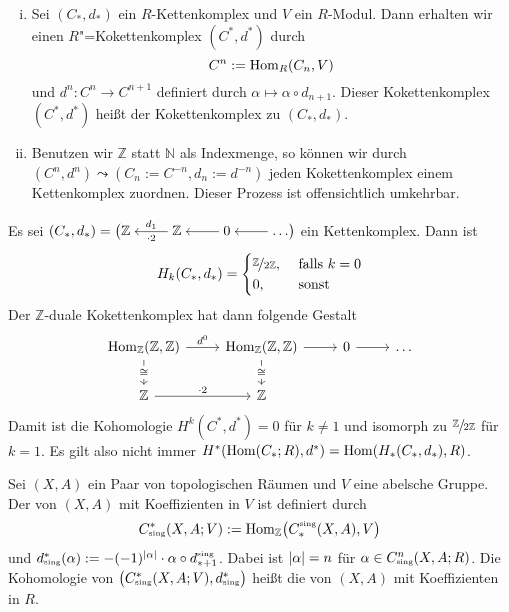 \begin{bemerkung} \leavevmode
	\begin{enumerate}[i)]
		\item Sei $(C_*,d_*)$ ein $R$-Kettenkomplex und $V$ ein $R$-Modul. Dann erhalten wir einen $R$"=Kokettenkomplex $(C^*,d^*)$ durch 
		\[
			C^n := \operatorname{Hom}_R(C_n,V) 
		\]
		und $d^n \colon C^n \to C^{n+1}$ definiert durch $\alpha \mapsto \alpha \circ d_{n+1}$. Dieser Kokettenkomplex $(C^*,d^*)$ heißt der 
		 Kokettenkomplex zu $(C_*,d_*)$. 
		\item Benutzen wir $\mathbb{Z}$ statt $\mathbb{N}$ als Indexmenge, so können wir durch $(C^n,d^n) \leadsto (C_n := C^{-n}, d_n := d^{-n})$ jeden Kokettenkomplex einem 
		Kettenkomplex zuordnen. Dieser Prozess ist offensichtlich umkehrbar.
	\end{enumerate}
\end{bemerkung}

\begin{beispiel}[{name=[Kohomologie ist nicht Dualisieren von Homologie]}]
	Es sei $(C_*,d_*)= \big(\begin{tikzcd}[cramped] \mathbb{Z} & \mathbb{Z} \lar["\cdot 2","d_1"'] & 0 \lar & \ldots \lar \end{tikzcd}\big)$ ein Kettenkomplex. 
	Dann ist
	\[
		H_k(C_*,d_*) = \begin{cases}
			\nicefrac{\mathbb{Z}}{2 \mathbb{Z}}, &\text{ falls } k =0\\
			0 , & \text{ sonst} 
		\end{cases}
	\]
	Der $\mathbb{Z}$-duale Kokettenkomplex hat dann folgende Gestalt
	\[
		\begin{tikzcd}
			 \Hom_{\mathbb{Z}}(\mathbb{Z},\mathbb{Z}) \rar["d^0"] \dar["\cong" description] & \Hom_{\mathbb{Z}}(\mathbb{Z},\mathbb{Z}) \rar \dar["\cong" description] 
			& 0 \rar & \ldots \\
			\mathbb{Z} \rar["\cdot 2"] & \mathbb{Z}
		\end{tikzcd}
	\]
	Damit ist die Kohomologie $H^k(C^*,d^*)=0$ für $k \neq 1$ und isomorph zu $\sfrac{\mathbb{Z}}{2 \mathbb{Z}}$ für $k=1$.
	Es gilt also nicht immer $H^*(\operatorname{Hom}(C_*;R),d^*) =  \operatorname{Hom} (H_*(C_*,d_*),R)$. 
\end{beispiel}

\begin{definition}[{name=[singulärer Kokettenkomplex]}]
	Sei $(X,A)$ ein Paar von topologischen Räumen und $V$ eine abelsche Gruppe. Der  von $(X,A)$ mit Koeffizienten in $V$ ist definiert durch
	\[
		C_\sing^*(X,A;V) := \Hom_\mathbb{Z} \enbrace[\big]{C_*^\sing(X,A),V}
	\]
	und $d^*_\sing(\alpha) := - (-1)^{\abs{\alpha}} \cdot \alpha \circ d_{*+1}^\sing$. Dabei ist $\lvert\alpha\rvert=n$ für $\alpha \in C^n_\sing(X,A;R)$. Die 
	Kohomologie von $\enbrace[\big]{C^*_\sing(X,A;V), d^*_\sing}$ heißt die  von $(X,A)$ mit Koeffizienten in $R$.
\end{definition}

